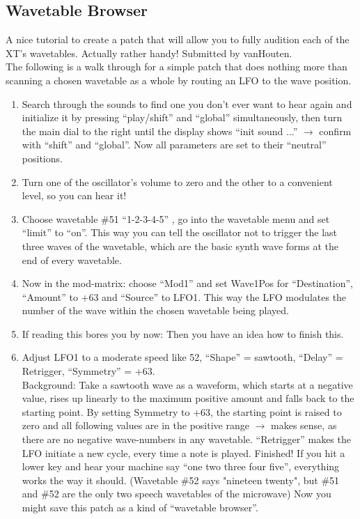 \subsection{Wavetable Browser}
A nice tutorial to create a patch that will allow you to fully audition each of the XT's wavetables. Actually rather handy! Submitted by vanHouten.\\
The following is a walk through for a simple patch that does nothing more than scanning a chosen wavetable as a whole by routing an LFO to the wave position.
\begin{enumerate}
	\item Search through the sounds to find one you don't ever want to hear again and initialize it by pressing ``play/shift'' and ``global'' simultaneously, then turn the main dial to the right until the display shows ``init sound ...'' $\to$ confirm with ``shift'' and ``global''.
	Now all parameters are set to their ``neutral'' positions. 
	\item Turn one of the oscillator's volume to zero and the other to a convenient level, so you can hear it!
	\item Choose wavetable \#51 ``1-2-3-4-5'' , go into the wavetable menu and set ``limit'' to ``on''. This way you can tell the oscillator not to trigger the last three waves of the wavetable, which are the basic synth wave forms at the end of every wavetable.
	\item Now in the mod-matrix: choose ``Mod1'' and set Wave1Pos for ``Destination'', ``Amount'' to +63 and ``Source'' to LFO1. This way the LFO modulates the number of the wave within the chosen wavetable being played.
	\item If reading this bores you by now: Then you have an idea how to finish this.
	\item Adjust LFO1 to a moderate speed like 52, ``Shape'' = sawtooth, ``Delay'' = Retrigger, ``Symmetry'' = +63.\\
	Background: Take a sawtooth wave as a waveform, which starts at a negative value, rises up linearly to the maximum positive amount and falls back to the starting point. By setting Symmetry to +63, the starting point is raised to zero and all following values are in the positive range $\to$ makes sense, as there are no negative wave-numbers in any wavetable. ``Retrigger'' makes the LFO initiate a new cycle, every time a note is played. Finished! If you hit a lower key and hear your machine say ``one two three four five'', everything works the way it should. (Wavetable \#52 says "nineteen twenty", but \#51 and \#52 are the only two speech wavetables of the microwave) Now you might save this patch as a kind of ``wavetable browser''.

\end{enumerate}
